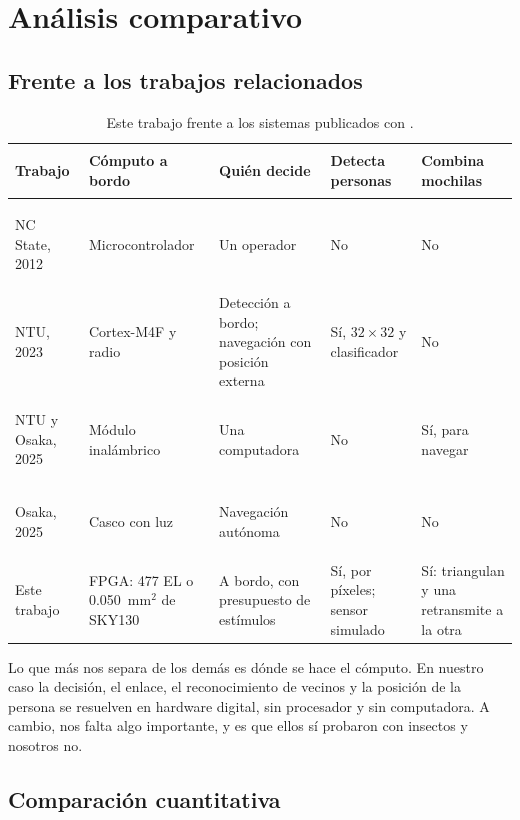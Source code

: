 \section{Análisis comparativo}
\label{sec:comparativo}

\subsection{Frente a los trabajos relacionados}

\begin{table}[!htb]
\centering\footnotesize
\caption{Este trabajo frente a los sistemas publicados con \Gp.}
\label{tab:cualitativa}
\begin{tabularx}{\textwidth}{@{}>{\bfseries\raggedright\arraybackslash}p{2.4cm} >{\raggedright\arraybackslash}p{3.0cm} >{\raggedright\arraybackslash}p{3.5cm} >{\raggedright\arraybackslash}p{2.4cm} >{\raggedright\arraybackslash}X@{}}
\toprule
\rowcolor{TableHead} Trabajo & Cómputo a bordo & Quién decide & Detecta personas & Combina mochilas \\
\midrule
NC State, 2012~\cite{latif2012} & Microcontrolador & Un operador & No & No \\
NTU, 2023~\cite{tranngoc2023} & Cortex-M4F y radio & Detección a bordo; navegación con posición externa & Sí, $32\times32$ y clasificador & No \\
NTU y Osaka, 2025~\cite{bai2025} & Módulo inalámbrico & Una computadora & No & Sí, para navegar \\
Osaka, 2025~\cite{refat2025} & Casco con luz & Navegación autónoma & No & No \\
Este trabajo & FPGA: 477 EL o 0.050~mm$^2$ de SKY130 & A bordo, con presupuesto de estímulos & Sí, por píxeles; sensor simulado & Sí: triangulan y una retransmite a la otra \\
\bottomrule
\end{tabularx}
\end{table}

Lo que más nos separa de los demás es dónde se hace el cómputo. En nuestro caso la decisión, el enlace, el reconocimiento de vecinos y la
posición de la persona se resuelven en hardware digital, sin procesador y sin computadora. A cambio, nos falta algo importante, y es que
ellos sí probaron con insectos y nosotros no.

\subsection{Comparación cuantitativa}
\label{sec:cuantitativo}

